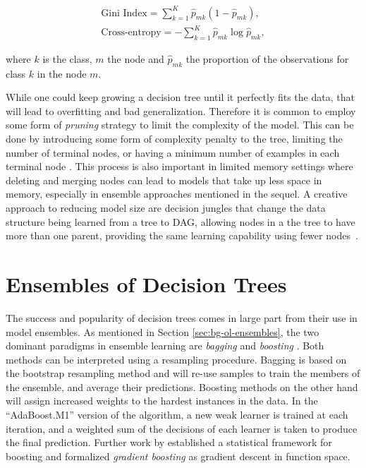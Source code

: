 \begin{equation}
	\begin{split}
		\text{Gini Index} = \sum_{k=1}^K\hat{p}_{mk}(1 - \hat{p}_{mk}), \\
		\text{Cross-entropy} = -\sum_{k=1}^K\hat{p}_{mk} \log{\hat{p}_{mk}},
	\end{split}
\end{equation}

\noindent
where $k$ is the class, $m$ the node and $\hat{p}_{mk}$ the proportion of
the observations for class $k$ in the node $m$.

While one could keep growing a decision tree until it perfectly fits the data,
that will lead to overfitting and bad generalization. Therefore
it is common to employ some form of \emph{pruning} strategy to limit the
complexity of the model. This can be done by introducing some
form of complexity penalty to the tree, limiting the number of terminal
nodes, or having a minimum number of examples in each terminal node
\cite{breiman1984cart}. This process is also important in limited
memory settings where deleting and merging nodes can lead to models
that take up less space in memory, especially in ensemble approaches
mentioned in the sequel. A creative approach to reducing model size are decision
jungles that change the data structure being learned from a tree to DAG, allowing
nodes in a the tree to have more than one parent,
providing the same learning capability using fewer nodes~\cite{decision-jungles}.


\section{Ensembles of Decision Trees}
\label{sec:bg-dt-ensembles}

The success and popularity of decision trees comes in large part
from their use in model ensembles.
As mentioned in Section \ref{sec:bg-ol-ensembles}, the two dominant paradigms in ensemble learning are \emph{bagging} \cite{bagging} and
\emph{boosting} \cite{boosting-schapire, boosting-freund-schapire}. Both
methods can be interpreted using a resampling procedure. Bagging is
based on the bootstrap \cite{bootstrap} resampling method and will re-use samples
to train the members of the ensemble, and average their predictions.
Boosting methods on the other hand will assign increased weights to the
hardest instances in the data. In the ``AdaBoost.M1'' version of the algorithm,
a new weak learner is trained at each iteration, and a weighted sum of
the decisions of each learner is taken to produce the final prediction.
Further work by \citet{gradient-boosting-breiman} established a statistical framework
for boosting and formalized \emph{gradient boosting} as gradient descent in function
space.

